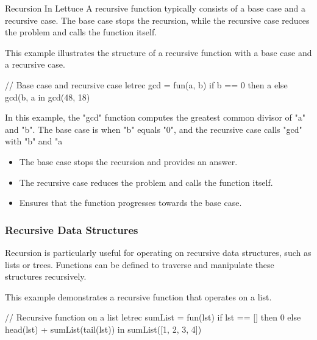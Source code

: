\begin{notes}{Recursion In Lettuce}
    A recursive function typically consists of a base case and a recursive case. The base case stops the recursion, while the recursive case reduces the problem and calls the function itself.
    
    \begin{highlight}
    
        This example illustrates the structure of a recursive function with a base case and a recursive case.
    
    \begin{code}[Lettuce]
    // Base case and recursive case
    letrec gcd = fun(a, b) {
        if b == 0 then a else gcd(b, a %
    } in
    gcd(48, 18)
    \end{code}
    
        In this example, the "gcd" function computes the greatest common divisor of "a" and "b". The base case is when "b" equals "0", and the recursive case calls "gcd" with "b" and "a %
    
        \begin{itemize}
            \item The base case stops the recursion and provides an answer.
            \item The recursive case reduces the problem and calls the function itself.
            \item Ensures that the function progresses towards the base case.
        \end{itemize}
    
    \end{highlight}
    
    \subsubsection*{Recursive Data Structures}
    
    Recursion is particularly useful for operating on recursive data structures, such as lists or trees. Functions can be defined to traverse and manipulate these structures recursively.
    
    \begin{highlight}
    
        This example demonstrates a recursive function that operates on a list.
    
    \begin{code}[Lettuce]
    // Recursive function on a list
    letrec sumList = fun(lst) {
        if lst == [] then 0 else head(lst) + sumList(tail(lst))
    } in
    sumList([1, 2, 3, 4])
    \end{code}
    

\end{highlight}
\end{notes}
